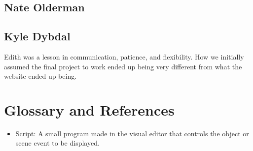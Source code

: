 \documentclass[12pt]{article}
\begin{document}
\subsection{Nate Olderman}

\subsection{Kyle Dybdal}
Edith was a lesson in communication, patience, and flexibility. How we initially assumed the final project to work ended up being very different from what the website ended up being. 
\section{Glossary and References}

\begin{itemize}
\item Script:  A small program made in the visual editor that controls the object or scene event to be displayed.
\end{itemize}
\end{document}
